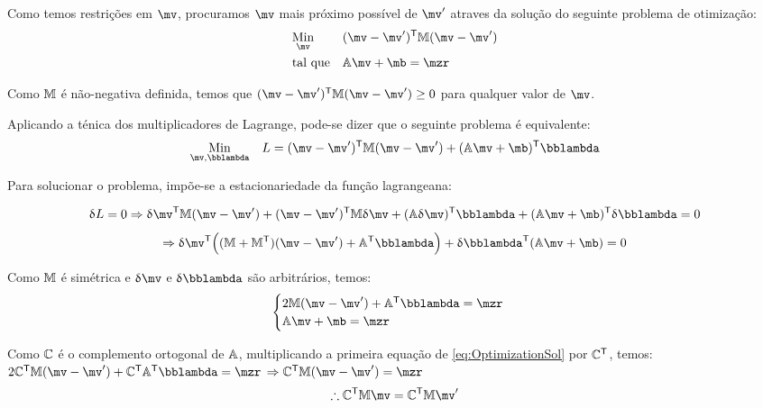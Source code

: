 Como temos restri\c{c}\~oes em $\mv$, procuramos $\mv$ mais pr\'oximo poss\'ivel de $\mv'$ atraves da solu\c{c}\~ao do seguinte problema de otimiza\c{c}\~ao:
\begin{equation} \label{eq:Optimization}
\begin{aligned}
& \underset{\mv}{\text{Min}}
& & (\mv - \mv')^\msT \mM (\mv - \mv') \\
& \text{tal que}
& & \mA \mv + \mb = \mzr
\end{aligned}
\end{equation}

Como $\mathbb{M}$ \'e n\~ao-negativa definida, temos que $(\mv - \mv')^\msT \mM (\mv - \mv') \geq 0 $ para qualquer valor de $\mv$.

Aplicando a t\'enica dos multiplicadores de Lagrange, pode-se dizer que o seguinte problema \'e equivalente:
\begin{equation}
\begin{aligned}
& \underset{\mv, \mlambda}{\text{Min}}
& & L = (\mv - \mv')^\msT \mM (\mv - \mv') + (\mA \mv + \mb)^\msT \mlambda \\
\end{aligned}
\end{equation}


Para solucionar o problema, imp\~oe-se a estacionariedade da fun\c{c}\~ao lagrangeana:

$$ \dl L = 0 \Rightarrow \dl \mv^\msT \mM (\mv - \mv') + (\mv - \mv')^\msT \mM \dl \mv + (\mA \dl \mv)^\msT \mlambda + (\mA \mv + \mb)^\msT \dl \mlambda = 0 $$
$$ \Rightarrow \dl \mv^\msT \Big( (\mM + \mM^\msT)(\mv - \mv') + \mA^\msT \mlambda \Big) + \dl \mlambda^\msT (\mA \mv + \mb) = 0 $$

Como $\mathbb{M}$ \'e sim\'etrica e $\dl \mv$ e $\dl \mlambda$ s\~ao arbitr\'arios, temos:
\begin{equation} \label{eq:OptimizationSol}
\begin{cases}
2 \mM (\mv - \mv') + \mA^\msT \mlambda = \mzr \\
\mA \mv + \mb = \mzr
\end{cases}
\end{equation}

Como $\mathbb{C}$ \'e o complemento ortogonal de $\mathbb{A}$, multiplicando a primeira equa\c{c}\~ao de \eqref{eq:OptimizationSol} por $\mathbb{C}^{\mathsf{T}}$, temos: \\

$ 2 \mC^\msT \mM (\mv - \mv') + \mC^\msT \mA^\msT \mlambda = \mzr $
$ \Rightarrow  \mC^\msT \mM (\mv - \mv')  = \mzr $
\begin{equation} \label{eq:OptimizationSol2}
\therefore \mC^\msT \mM \mv  = \mC^\msT \mM  \mv'
\end{equation}

